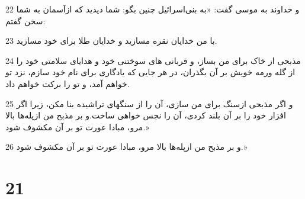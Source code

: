 \par 22 و خداوند به موسی گفت: «به بنی‌اسرائیل چنین بگو: شما دیدید که ازآسمان به شما سخن گفتم:
\par 23 با من خدایان نقره مسازید و خدایان طلا برای خود مسازید.
\par 24 مذبحی از خاک برای من بساز، و قربانی های سوختنی خود و هدایای سلامتی خود را از گله ورمه خویش بر آن بگذران، در هر جایی که یادگاری برای نام خود سازم، نزد تو خواهم آمد، و تو را برکت خواهم داد.
\par 25 و اگر مذبحی ازسنگ برای من سازی، آن را از سنگهای تراشیده بنا مکن، زیرا اگر افزار خود را بر آن بلند کردی، آن را نجس خواهی ساخت.و بر مذبح من ازپله‌ها بالا مرو، مبادا عورت تو بر آن مکشوف شود.»
\par 26 و بر مذبح من ازپله‌ها بالا مرو، مبادا عورت تو بر آن مکشوف شود.»
 
\chapter{21}

